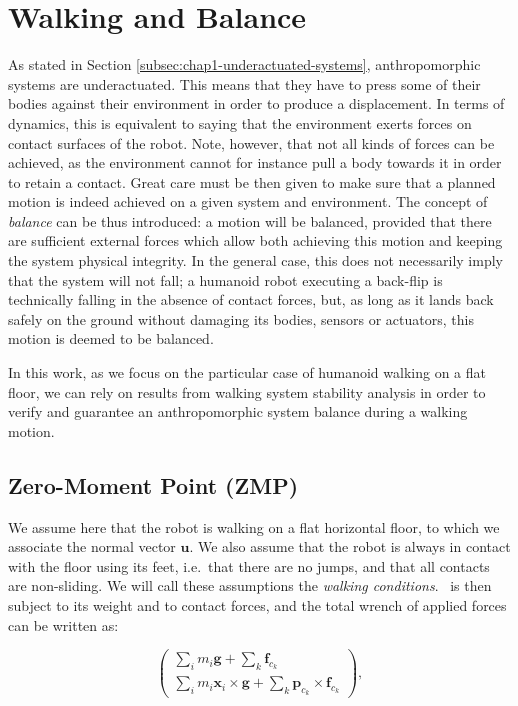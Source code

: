 \section{Walking and Balance}
\label{sec:chap1-pattern-generator}

As stated in Section \ref{subsec:chap1-underactuated-systems},
anthropomorphic systems are underactuated. This means that they have
to press some of their bodies against their environment in order to
produce a displacement. In terms of dynamics, this is equivalent to
saying that the environment exerts forces on contact surfaces of the
robot. Note, however, that not all kinds of forces can be achieved, as
the environment cannot for instance pull a body towards it in order to
retain a contact. Great care must be then given to make sure that a
planned motion is indeed achieved on a given system and
environment. The concept of \emph{balance} can be thus introduced: a
motion will be balanced, provided that there are sufficient external
forces which allow both achieving this motion and keeping the system
physical integrity. In the general case, this does not necessarily
imply that the system will not fall; a humanoid robot executing a
back-flip is technically falling in the absence of contact forces,
but, as long as it lands back safely on the ground without damaging
its bodies, sensors or actuators, this motion is deemed to be
balanced.

In this work, as we focus on the particular case of humanoid walking
on a flat floor, we can rely on results from walking system stability
analysis \cite{wieber2002} in order to verify and guarantee an
anthropomorphic system balance during a walking motion.

\subsection{Zero-Moment Point (ZMP)}
\label{subsec:chap1-zmp}

We assume here that the robot {\robot} is walking on a flat horizontal
floor, to which we associate the normal vector $\mathbf{u}$. We also
assume that the robot is always in contact with the floor using its
feet, i.e.\ that there are no jumps, and that all contacts are
non-sliding. We will call these assumptions the \emph{walking
  conditions}. {\robot}~is then subject to its weight and to contact
forces, and the total wrench of applied forces can be written as:

\begin{equation}
  \left(\begin{matrix}
    \sum_i m_i\mathbf{g}+\sum_k \mathbf{f}_{c_k} \\
    \sum_i m_i\mathbf{x}_i\times\mathbf{g}
    +\sum_k\mathbf{p}_{c_k}\times\mathbf{f}_{c_k}
  \end{matrix}\right),
\end{equation}

